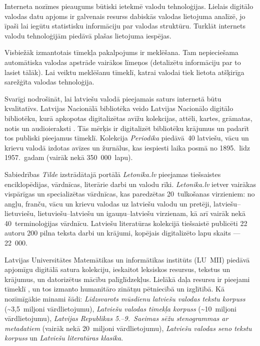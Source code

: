 \begin{multicols}{2}
Interneta nozīmes pieaugums būtiski ietekmē valodu tehnoloģijas. 
Lielais digitālo valodas datu apjoms ir galvenais resurss dabiskās valodas lietojuma analīzē, jo īpaši lai iegūtu statistisku informāciju par valodas struktūru.
Turklāt internets valodu tehnoloģijām piedāvā plašas lietojuma iespējas. 

Visbiežāk izmantotais tīmekļa pakalpojums ir meklēšana.
Tam nepieciešama automātiska valodas apstrāde vairākos līmeņos (detalizētu informāciju par to lasiet tālāk).
Lai veiktu meklēšanu tīmeklī, katrai valodai tiek lietota atšķirīga sarežģīta valodas tehnoloģija.

Svarīgi nodrošināt, lai latviešu valodā pieejamais saturs internetā būtu kvalitatīvs.
Latvijas Nacionālā bibliotēka veido Latvijas Nacionālo digitālo bibliotēku, kurā apkopotas digitalizētas avīžu kolekcijas, attēli, kartes, grāmatas, notis un audioieraksti \cite{Meta6}.
Tās mērķis ir digitalizēt bibliotēku krājumus un padarīt tos publiski pieejamus tīmeklī.
Kolekcija \textit{Periodika} piedāvā~40 latviešu, vācu un krievu valodā izdotas avīzes un žurnālus, kas iespiesti laika posmā no 1895.~līdz 1957.~gadam (vairāk nekā 350~000~lapu).

Sabiedrības \textit{Tilde} izstrādātajā portālā \textit{Letonika.lv} pieejamas tiešsaistes enciklopēdijas, vārdnīcas, literārie darbi un valodu rīki.
\textit{Letonika.lv} ietver vairākas vispārīgas un specializētas vārdnīcas, kas paredzētas 20~tulkošanas virzieniem: no angļu, franču, vācu un krievu valodas uz latviešu valodu un pretēji, latviešu--lietuviešu, lietuviešu--latviešu un igauņu--latviešu virzienam, kā arī vairāk nekā 40~terminoloģijas vārdnīcu.
Latviešu literatūras kolekcijā tiešsaistē publicēti 22 autoru 200 pilna teksta darbi un krājumi, kopējais digitalizēto lapu skaits — 22~000.

Latvijas Universitātes Matemātikas un informātikas institūts (LU~MII) piedāvā apjomīgu digitālā satura kolekciju, ieskaitot leksiskos resursus, tekstus un krājumus, un datorizētus mācību palīglīdzekļus.
Lielākā daļa resursu ir pieejami tīmeklī \cite{Meta7}, un tos izmanto humanitāro zinātņu pētniecībā un izglītībā.
Kā nozīmīgākie minami šādi: \textit{Līdzsvarots mūsdienu latviešu valodas tekstu korpuss} \cite{Meta8} ${}^{ }$(\~{}3,5~miljoni vārdlietojumu), \textit{Latviešu valodas tīmekļa korpuss} (\~{}10~miljoni vārdlietojumu), \textit{Latvijas Republikas 5.--9.~Saeimas sēžu stenogrammas ar metadatiem} (vairāk nekā 20~miljoni vārdlietojumu), \textit{Latviešu valodas seno tekstu korpuss} \cite{Meta9, metaAndronova} un \textit{Latviešu literatūras klasika}.


\end{multicols}
